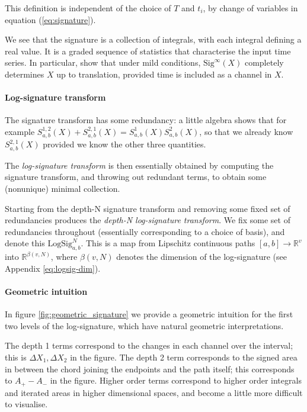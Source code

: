 \documentclass{article}
\newcommand{\logsig}{\mathrm{LogSig}}
\newcommand{\reals}{\mathbb{R}}
\begin{document}
This definition is independent of the choice of $T$ and $t_i$, by change of variables in equation (\ref{eq:signature}).

We see that the signature is a collection of integrals, with each integral defining a real value. It is a graded sequence of statistics that characterise the input time series. In particular, \citep{hambly2010sigunique} show that under mild conditions, $\mathrm{Sig}^\infty(X)$ completely determines $X$ up to translation, provided time is included as a channel in $X$.

\paragraph{Log-signature transform} The signature transform has some redundancy: a little algebra shows that for example $S^{1, 2}_{a, b}(X) + S^{2, 1}_{a, b}(X) = S^1_{a, b}(X) S^2_{a, b}(X)$, so that we already know $S^{2, 1}_{a, b}(X)$ provided we know the other three quantities.

The \emph{log-signature transform} is then essentially obtained by computing the signature transform, and throwing out redundant terms, to obtain some (nonunique) minimal collection. 









Starting from the depth-N signature transform and removing some fixed set of redundancies produces the \emph{depth-N log-signature transform}. We fix some set of redundancies throughout (essentially corresponding to a choice of basis), and denote this $\logsig^N_{a, b}$. This is a map from Lipschitz continuous paths $[a, b] \to \reals^v$ into $\reals^{\beta(v, N)}$, where $\beta(v, N)$ denotes the dimension of the log-signature (see Appendix \ref{eq:logsig-dim}).

\paragraph{Geometric intuition} In figure \ref{fig:geometric_signature} we provide a geometric intuition for the first two levels of the log-signature, which have natural geometric interpretations.

The depth 1 terms correspond to the changes in each channel over the interval; this is $\Delta X_1, \Delta X_2$ in the figure. The depth 2 term corresponds to the signed area in between the chord joining the endpoints and the path itself; this corresponds to $A_{+} - A_{-}$ in the figure. Higher order terms correspond to higher order integrals and iterated areas in higher dimensional spaces, and become a little more difficult to visualise.
\end{document}
